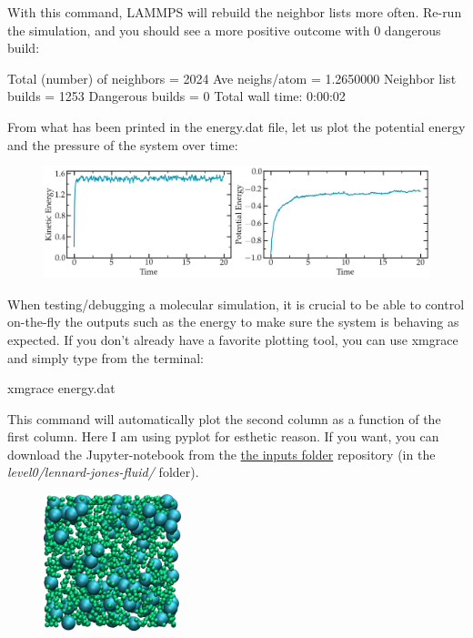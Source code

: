 \noindent With this command, LAMMPS will rebuild the neighbor lists
more often. Re-run the simulation, and you should see a more
positive outcome with 0 dangerous build:

\begin{lcverbatim}
Total (number) of neighbors = 2024
Ave neighs/atom = 1.2650000
Neighbor list builds = 1253
Dangerous builds = 0
Total wall time: 0:00:02
\end{lcverbatim}

\noindent From what has been printed in the energy.dat file, let us
plot the potential energy and the pressure of
the system over time:

\begin{figure}
\includegraphics[width=\linewidth]{tutorials/level0/lennard-jones-fluid/energy-light.png}
\end{figure}

\begin{tcolorbox}[colback=mylightblue!5!white,colframe=mylightblue!75!black,title=On the necessity of plotting data efficiently]
When testing/debugging a molecular simulation, it is crucial to be able to control 
on-the-fly the outputs such as the energy to make sure the
system is behaving as expected. If you don't already have 
a favorite plotting tool, you can use xmgrace and simply type from the terminal:
\begin{lcverbatim}
xmgrace energy.dat
\end{lcverbatim}

\noindent This command will automatically plot the second column as a function of the first column.
Here I am using pyplot for esthetic reason. If you want, you can download the Jupyter-notebook
from the \href{https://github.com/lammpstutorials/lammpstutorials.github.io/tree/version2.0/docs/inputs}{the inputs folder} repository (in the \textit{level0/lennard-jones-fluid/} folder).
\end{tcolorbox}

\begin{figure}
\begin{center}
\includegraphics[width=4cm]{tutorials/level0/lennard-jones-fluid/input1.png}
\end{center}
\end{figure}

